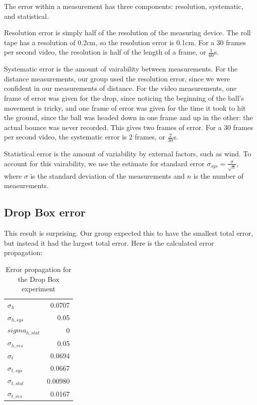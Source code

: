 \documentclass[12pt]{article}
\begin{document}
The error within a measurement has three components: resolution, systematic, and statistical.

Resolution error is simply half of the resolution of the measuring device. The roll tape has a resolution of 0.2cm, so the resolution error is 0.1cm. For a 30 frames per second video, the resolution is half of the length of a frame, or \(\frac{1}{60}\)s.

Systematic error is the amount of vairability between measurements. For the distance measurements, our group used the resolution error, since we were confident in our measurements of distance. For the video measurements, one frame of error was given for the drop, since noticing the beginning of the ball's movement is tricky, and one frame of error was given for the time it took to hit the ground, since the ball was headed down in one frame and up in the other: the actual bounce was never recorded. This gives two frames of error. For a 30 frames per second video, the systematic error is 2 frames, or \(\frac{2}{30}\)s.

Statistical error is the amount of variability by external factors, such as wind. To account for this vairability, we use the estimate for standard error \(\sigma_{sys} = \frac{\sigma}{\sqrt{n}}\), where \(\sigma\) is the standard deviation of the measurements and \(n\) is the number of measurements.
\subsection{Drop Box error}
\label{sec:org92c71c2}

This result is surprising. Our group expected this to have the smallest total error, but instead it had the largest total error. Here is the calculated error propagation:

\begin{table}[htbp]
\caption{\label{table:dropbox-error}Error propagation for the Drop Box experiment}
\centering
\begin{tabular}{l|r}
\hline
\(\sigma_h\) & 0.0707\\
\(\sigma_{h,sys}\) & 0.05\\
\(sigma_{h,stat}\) & 0\\
\(\sigma_{h,res}\) & 0.05\\
\hline
\(\sigma_t\) & 0.0694\\
\(\sigma_{t,sys}\) & 0.0667\\
\(\sigma_{t,stat}\) & 0.00980\\
\(\sigma_{t,res}\) & 0.0167\\
\hline
\end{tabular}
\end{table}
\end{document}
